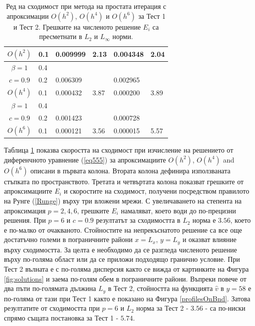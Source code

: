 \documentclass[a4paper]{article}
\newcommand{\rf}[1]{(\ref{#1})}
\theoremstyle{remark}
\begin{document}
\begin{table}[ht]
\begin{tabular}{||c|l|ll|ll||}
     $O(h^2)$	&0.1  & 0.009999 & 2.13       & 0.004348      & 2.04  \\
\hline 	
 $\beta = 1$   	&0.4  &            &               &               &     \\
     $c=0.9$  	&0.2   & 0.006309  &              & 0.002965      &        \\
     $O(h^4)$	&0.1  &  0.000432 &3.87        & 0.000200 &  3.89        \\
    \hline
 $\beta = 1$	&0.4   &             &        &               &        \\
   $ c=0.9$  	&0.2   &  0.001423  &        & 0.000728      &       \\
       $O(h^6)$	&0.1  &   0.000121 &3.56  & 0.000015 &   5.57       \\
	   \hline
			\hline 
		\end{tabular}
		\caption{Ред на сходимост при метода на простата итерация с апроксимации $O(h^{2})$, $O(h^{4})$ и $O(h^{6})$ за Тест  1 и Тест 2. Грешките на численото решение $E_i$ са пресметнати в $L_2$ и $L_\infty$ норми.}
\label{tab:a}
\end{table}
\FloatBarrier
Таблица \ref{tab:a} показва скоростта на сходимост при изчисление на решението от диференчното уравнение \rf{eq555} за апроксимациите $O(h^{2})$, $O(h^{4})$ and $O(h^{6})$ описани в първата колона. Втората колона дефинира използваната стъпката по пространството. Третата и четвъртата колона показват грешките от апроксимациите $E_i$ и скоростите на сходимост, получени посредством правилото на Рунге \rf{Runge} върху три вложени мрежи. С увеличаването на степента на апроксимация $p=2,4,6$, грешките $E_i$ намаляват, което води до по-прецизни решения. При $p=6$ и $c=0.9$ резултатът за сходимостта в $L_2$ норма е $3.56$, което е по-малко от очакваното. Стойностите на непрекъснатото решение са все още достатъчно големи в пограничните райони $x=L_x$, $y=L_y$ и оказват влияние върху сходимостта. За целта е необходимо да се разгледа численото решение върху по-голяма област или да се приложи подходящо гранично условие.  При Тест 2 вълната е с по-голяма дисперсия както се вижда от картинките на Фигура \ref{fig:solutions} и заема по-голям обем в пограничните райони. Въпреки повече от два пъти по-голямата дължина $L_y$ в Тест 2, стойността на функцията $\widehat v$ в $y=58$ е по-голяма от тази при Тест 1 както е показано на Фигура \ref{profilesOnBnd}. Затова резултатите от сходимостта при $p=6$ и $L_2$ норма за Тест 2 - $3.56$ - са по-ниски спрямо същата постановка за Тест 1 - $5.74$.
\end{document}
